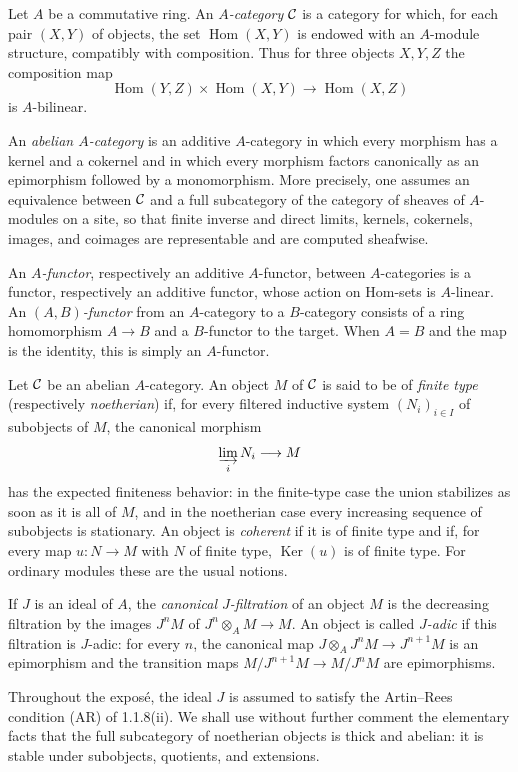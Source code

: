 \documentclass[11pt]{article}
\theoremstyle{plain}
\theoremstyle{definition}
\theoremstyle{remark}
\DeclareMathOperator{\Hom}{Hom}
\DeclareMathOperator{\Ker}{Ker}
\begin{document}
Let $A$ be a commutative ring. An \emph{$A$-category} $\mathcal C$ is a category for which,
for each pair $(X,Y)$ of objects, the set $\Hom(X,Y)$ is endowed with an
$A$-module structure, compatibly with composition. Thus for three objects
$X,Y,Z$ the composition map
\[
       \Hom(Y,Z)\times\Hom(X,Y)\longrightarrow\Hom(X,Z)
\]
is $A$-bilinear.

An \emph{abelian $A$-category} is an additive $A$-category in which every morphism
has a kernel and a cokernel and in which every morphism factors canonically as an
epimorphism followed by a monomorphism. More precisely, one assumes an equivalence
between $\mathcal C$ and a full subcategory of the category of sheaves of $A$-modules on a
site, so that finite inverse and direct limits, kernels, cokernels, images, and
coimages are representable and are computed sheafwise.

An \emph{$A$-functor}, respectively an additive $A$-functor, between $A$-categories
is a functor, respectively an additive functor, whose action on Hom-sets is
$A$-linear. An \emph{$(A,B)$-functor} from an $A$-category to a $B$-category consists
of a ring homomorphism $A\to B$ and a $B$-functor to the target. When $A=B$ and the
map is the identity, this is simply an $A$-functor.

Let $\mathcal C$ be an abelian $A$-category. An object $M$ of $\mathcal C$ is said to be of
\emph{finite type} (respectively \emph{noetherian}) if, for every filtered inductive
system $(N_i)_{i\in I}$ of subobjects of $M$, the canonical morphism
\[
       \varinjlim_i N_i\longrightarrow M
\]
has the expected finiteness behavior: in the finite-type case the union stabilizes
as soon as it is all of $M$, and in the noetherian case every increasing sequence of
subobjects is stationary. An object is \emph{coherent} if it is of finite type and if,
for every map $u:N\to M$ with $N$ of finite type, $\Ker(u)$ is of finite type. For
ordinary modules these are the usual notions.

If $J$ is an ideal of $A$, the \emph{canonical $J$-filtration} of an object $M$ is the
decreasing filtration by the images $J^nM$ of
$J^n\otimes_A M\to M$. An object is called \emph{$J$-adic} if this filtration is
$J$-adic: for every $n$, the canonical map
$J\otimes_A J^nM\to J^{n+1}M$ is an epimorphism and the transition maps
$M/J^{n+1}M\to M/J^nM$ are epimorphisms.

Throughout the exposé, the ideal $J$ is assumed to satisfy the Artin--Rees condition
(AR) of 1.1.8(ii). We shall use without further comment the elementary facts that
the full subcategory of noetherian objects is thick and abelian: it is stable under
subobjects, quotients, and extensions.
\end{document}
